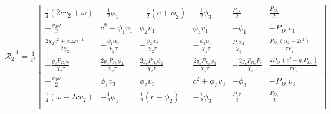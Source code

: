 \begin{align*}
  \mathcal{R}_{2}^{-1} = \frac{1}{c^2}
  \left[
  \begin{array}{cccccc}
   \frac{1}{4} (2 c  v_{2}+\omega ) & -\frac{1}{2} \phi_{1} & -\frac{1}{2} (c+\phi_{2})
    & -\frac{1}{2} \phi_{3}  & \frac{P_{\epsilon} \tau }{2} & \frac{P_{D_{e}}}{2}
     \\
   -\frac{v_{2} \omega }{2} & c^2 + \phi_{1} v_{1}  & \phi_{2} v_{1}  &
     \phi_{3} v_{1}  & -\phi_{1}  & -P_{D_{e}} v_{1}
     \\
   \frac{2 \chi_{2}  c^2+\alpha_{2}  \omega \tau^{-1} }{2 \chi_{2} } & -\frac{\phi_{1} \alpha_{2}  }{\chi_{2} \tau } &
     -\frac{\phi_{2} \alpha_{2}  }{\chi_{2} \tau } & -\frac{\phi_{3} \alpha_{2} }{\chi_{2} \tau } &
     \frac{P_{\epsilon} \alpha_{2} }{\chi_{2} } & \frac{P_{D_{e}} \left(\alpha_{2} -2 c^2\right)}{\tau \chi_{2} }
      \\
   -\frac{y_{e} P_{D_{e}} \omega }{\chi_{2} \tau } & \frac{2 y_{e} P_{D_{e}} \phi_{1} }{\chi_{2} \tau } & \frac{2 y_{e} P_{D_{e}}
     \phi_{2} }{\chi_{2} \tau} & \frac{2 y_{e} P_{D_{e}} \phi_{3} }{\chi_{2} \tau} & -\frac{2 y_{e}
     P_{D_{e}} P_{\epsilon} }{\chi_{2} } & \frac{2 P_{D_{e}} \left(c^2-y_{e} P_{D_{e}} \right)}{\tau \chi_{2} }
      \\
   -\frac{v_{3} \omega }{2} & \phi_{1} v_{3}  & \phi_{2} v_{3}   &
     c^2+\phi_{3} v_{3}  & -\phi_{3}  & -P_{D_{e}} v_{3}
      \\
   \frac{1}{4} (\omega -2 c  v_{2}) & -\frac{1}{2} \phi_{1}  & \frac{1}{2} (c-\phi_{2})
       & -\frac{1}{2} \phi_{3}  & \frac{P_{\epsilon} \tau }{2} & \frac{P_{D_{e}}}{2}
     \\
  \end{array}
  \right]
\end{align*}

